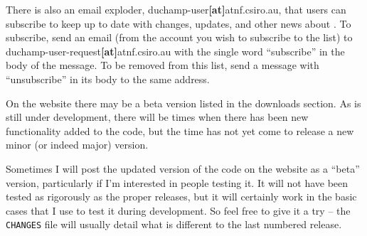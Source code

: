 There is also an email exploder, duchamp-user\textbf{[at]}atnf.csiro.au,
that users can subscribe to keep up to date with changes, updates, and
other news about \duchamp. To subscribe, send an email (from the
account you wish to subscribe to the list) to
duchamp-user-request\textbf{[at]}atnf.csiro.au with the single word
``subscribe'' in the body of the message. To be removed from this
list, send a message with ``unsubscribe'' in its body to the same
address.


On the \duchamp website there may be a beta version listed in the
downloads section. As \duchamp is still under development, there will
be times when there has been new functionality added to the code, but
the time has not yet come to release a new minor (or indeed major)
version. 

Sometimes I will post the updated version of the code on the website
as a ``beta'' version, particularly if I'm interested in people
testing it. It will not have been tested as rigorously as the proper
releases, but it will certainly work in the basic cases that I use to
test it during development. So feel free to give it a try -- the
\texttt{CHANGES} file will usually detail what is different to the last
numbered release.
